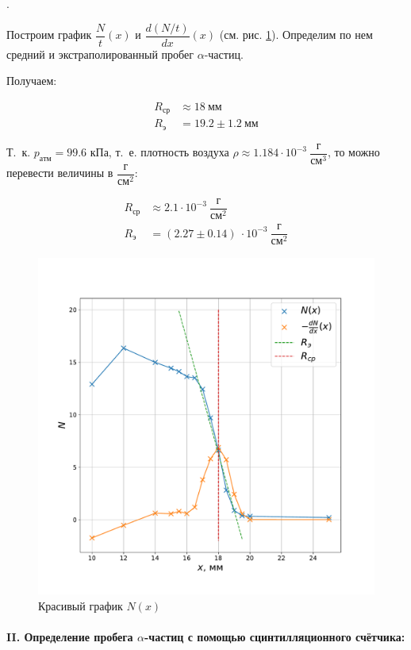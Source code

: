 \documentclass[a4paper, 12pt]{article}
\newcommand{\parag}[1]{\paragraph*{#1:}}
\newcounter{Points}
\newcommand{\point}{\arabic{Points}. \addtocounter{Points}{1}}
\begin{document}
\point Построим график $\dfrac{N}{t} (x)$ и $\dfrac{d (N/t)}{dx} (x)$ (см. рис. \ref{img:geig}). Определим по нем средний и экстраполированный пробег $\alpha$-частиц.

Получаем: 

\begin{align*}
    R_{ср} &\approx 18 ~ мм \\
    R_э &= 19.2 \pm 1.2 ~ мм
\end{align*}

Т.~к. $p_{атм} = 99.6$ кПа, т.~е. плотность воздуха $\rho \approx 1.184 \cdot 10^{-3}~\dfrac{г}{см^3}$, то можно перевести величины в $\dfrac{г}{см^2}$:

\begin{align*}
    R_{ср} &\approx 2.1 \cdot 10^{-3} ~ \dfrac{г}{см^2} \\
    R_э &= (2.27 \pm 0.14) ~ \cdot 10^{-3} ~ \dfrac{г}{см^2}
\end{align*}

\begin{figure}[!h]
    \includegraphics[scale = 0.4]{geig}
    \centering
    \caption{Красивый график $N(x)$}
    \label{img:geig}
\end{figure}

\newpage

\parag {II. Определение пробега $\alpha$-частиц с помощью сцинтилляционного счётчика} ~\\
\end{document}
